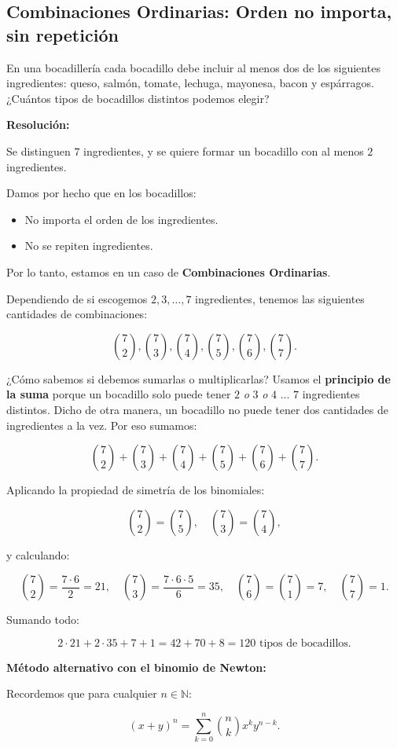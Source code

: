 \documentclass[a4paper,12pt]{article}
\begin{document}
\subsection{Combinaciones Ordinarias: Orden no importa, sin repetición}

\begin{ejercicio}[title=Ejercicio 8]
En una bocadillería cada bocadillo debe incluir al menos dos de los siguientes ingredientes: queso, salmón, tomate, lechuga, mayonesa, bacon y espárragos. ¿Cuántos tipos de bocadillos distintos podemos elegir?

\tcblower
\textbf{Resolución:}

Se distinguen $7$ ingredientes, y se quiere formar un bocadillo con al menos $2$ ingredientes.  

Damos por hecho que en los bocadillos:

\begin{itemize}
\item No importa el orden de los ingredientes.
\item No se repiten ingredientes.
\end{itemize}

Por lo tanto, estamos en un caso de \textbf{Combinaciones Ordinarias}.

Dependiendo de si escogemos $2, 3, \dots, 7$ ingredientes, tenemos las siguientes cantidades de combinaciones:

\[
\binom{7}{2}, \binom{7}{3}, \binom{7}{4}, \binom{7}{5}, \binom{7}{6}, \binom{7}{7}.
\]

¿Cómo sabemos si debemos sumarlas o multiplicarlas?  
Usamos el \textbf{principio de la suma} porque un bocadillo solo puede tener $2$ \emph{o} $3$ \emph{o} $4$ ... $7$ ingredientes distintos. Dicho de otra manera, un bocadillo no puede tener dos cantidades de ingredientes a la vez. Por eso sumamos:

\[
\binom{7}{2} + \binom{7}{3} + \binom{7}{4} + \binom{7}{5} + \binom{7}{6} + \binom{7}{7}.
\]

Aplicando la propiedad de simetría de los binomiales:

\[
\binom{7}{2} = \binom{7}{5}, \quad \binom{7}{3} = \binom{7}{4},
\]

y calculando:

\[
\binom{7}{2} = \frac{7 \cdot 6}{2} = 21, \quad
\binom{7}{3} = \frac{7 \cdot 6 \cdot 5}{6} = 35, \quad
\binom{7}{6} = \binom{7}{1} = 7, \quad
\binom{7}{7} = 1.
\]

Sumando todo:

\[
2 \cdot 21 + 2 \cdot 35 + 7 + 1 = 42 + 70 + 8 = \boxed{120 \text{ tipos de bocadillos}}.
\]

\medskip
\textbf{Método alternativo con el binomio de Newton:}

Recordemos que para cualquier $n \in \mathbb{N}$:

\[
(x+y)^n = \sum_{k=0}^{n} \binom{n}{k} x^k y^{n-k}.
\]

\end{ejercicio}
\end{document}
